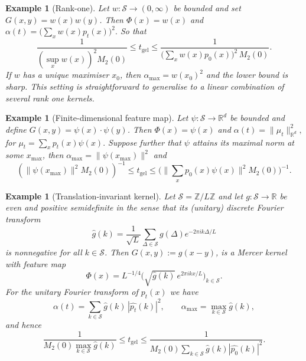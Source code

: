 \documentclass[12pt,twoside]{article}
\newtheorem{example}[thm]{Example}
\begin{document}
 

 \begin{example}[Rank-one]\label{ex:rank-one-mercer}
Let $w:\mathcal S\to(0,\infty)$ be bounded and set $G(x,y)=w(x)w(y)$.
Then $\Phi(x)=w(x)$ and $\alpha(t)=\big(\sum_x w(x)p_t(x)\big)^2.$ So that
\[
\frac{1}{(\sup_x w(x))^2 M_2(0)}\le t_{\mathrm{gel}}\le\frac{1}{\big(\sum_x w(x)p_0(x)\big)^2\,M_2(0)}.
\]
If $w$ has a unique maximiser $x_0$, then $\alpha_{\max}=w(x_0)^2$ and
the lower bound is sharp. This setting is straightforward to generalise to a linear combination of several rank one kernels.
\end{example}
\begin{example}[Finite-dimensional feature map]\label{ex:finite-dim-mercer}
Let $\psi:\mathcal S\to\mathbb R^d$ be bounded and define
$G(x,y)=\psi(x)\cdot\psi(y)$. Then $\Phi(x)=\psi(x)$ and $\alpha(t)=\|\mu_t\|_{\mathbb R^d}^2, $ for $\mu_t=\sum_x p_t(x)\psi(x).$
 Suppose further that $\psi$ attains its maximal norm at some $x_{\max}$, then $\alpha_{\max}=\|\psi(x_{\max})\|^2$ and 
\[
\left(\|\psi(x_{\max})\|^2 M_2(0)\right)^{-1}\le t_{\mathrm{gel}}\le\Big(\|\sum_x p_0(x)\psi(x)\|^2M_2(0)\Big)^{-1}.
\]

\end{example}

\begin{example}[Translation-invariant kernel]
Let $\mathcal S=\mathbb Z/L\mathbb Z$ and let
$g:\mathcal S\to\mathbb R$ be even and positive semidefinite in the sense
that its (unitary) discrete Fourier transform
\[
\hat g(k)
=
\frac{1}{\sqrt{L}}\sum_{\Delta\in\mathcal S}
g(\Delta)e^{-2\pi i k\Delta/L}
\]
is nonnegative for all $k\in\mathcal S$.
Then $G(x,y):=g(x-y)$, is a Mercer kernel with feature map
\[
\Phi(x)=L^{-1/4}\bigl(\sqrt{\hat g(k)}\,e^{2\pi i kx/L}\bigr)_{k\in\mathcal S}.
\]
For the unitary Fourier transform of $p_t(x)$ we have
\[
\alpha(t)
=
\sum_{k\in\mathcal S}
\hat g(k)\,|\widehat{p_t}(k)|^2,
\qquad
\alpha_{\max}
=
\max_{k\in\mathcal S}\hat g(k),
\]
and hence
\[
\frac{1}{M_2(0)\max_{k\in\mathcal S}\hat g(k)}
\le
t_{\mathrm{gel}}
\le
\frac{1}{M_2(0)\sum_{k\in\mathcal S}
\hat g(k)|\widehat{p_0}(k)|^2}.
\]
\end{example}
\end{document}

